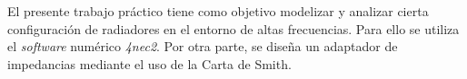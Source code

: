 El presente trabajo práctico tiene como objetivo modelizar y analizar cierta configuración de radiadores en el entorno de altas frecuencias. Para ello se utiliza el \textit{software} numérico \textit{4nec2}. Por otra parte, se diseña un adaptador de impedancias mediante el uso de la Carta de Smith.